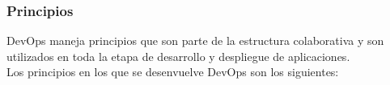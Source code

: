 \documentclass[preprint,12pt]{elsarticle}
\begin{document}
\subsubsection{\textbf{Principios}}

DevOps maneja principios que son parte de la estructura colaborativa y son utilizados en toda la etapa de desarrollo y despliegue de aplicaciones. \\Los principios en los que se desenvuelve DevOps son los siguientes:  \cite{Humble2011}   \cite{Huttermann2012}   

\end{document}
